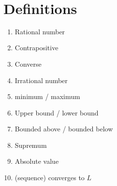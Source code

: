 \documentclass[12pt]{amsart}
\begin{document}

\

\section*{Definitions}

\begin{enumerate}
	\item Rational number
	\item Contrapositive
	\item Converse
	\item Irrational number
	\item minimum / maximum
	\item Upper bound / lower bound
	\item Bounded above / bounded below
	\item Supremum%
			\item Absolute value
	\item (sequence) converges to $L$
	\begin{comment}

	\item (sequence) is convergent
	
	\item (sequence) is divergent

	\item increasing / decreasing sequence
	\item strictly increasing / decreasing sequence
	\item monotone sequence
	\item diverges to $+\infty$ or $-\infty$		
					
	\item Subsequence
	



	\item Limit of a function

	\item Continuous at a point
	\item Continuous on an open interval

	\item Continuous on a closed interval
	
	\item Differentiable
	\item Derivative (at a point)
	\item Derivative (function)
		\item Increasing/decreasing function

\end{comment}
\end{enumerate}
\end{document}
